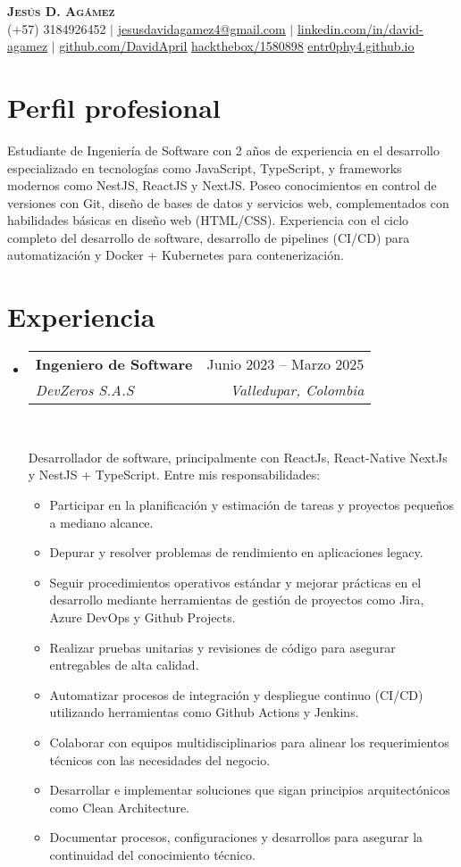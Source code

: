 \documentclass[letterpaper,11pt]{article}
\makeatletter
\newcommand{\resumeItem}[1]{
  \item\small{
    {#1 \vspace{-2pt}}
  }
}
\newcommand{\resumeSubheading}[4]{
  \vspace{-2pt}\item
    \begin{tabular*}{0.97\textwidth}[t]{l@{\extracolsep{\fill}}r}
      \textbf{#1} & #2 \\
      \textit{\small#3} & \textit{\small #4} \\
    \end{tabular*}\vspace{-7pt}
}
\newcommand{\resumeSubHeadingListStart}{\begin{itemize}[leftmargin=0.15in, label={}]}
\newcommand{\resumeSubHeadingListEnd}{\end{itemize}}
\newcommand{\resumeItemListStart}{\begin{itemize}}
\newcommand{\resumeItemListEnd}{\end{itemize}\vspace{-5pt}}
\makeatother
\begin{document}
\begin{center}
    \textbf{\Huge \scshape Jesús D. Agámez} \\ \vspace{1pt}
    \small (+57) 3184926452 $|$ \href{mailto:jesusdavidagamez4@gmail.com}{\underline{jesusdavidagamez4@gmail.com}} $|$
    \href{https://linkedin.com/in/david-agamez}{\underline{linkedin.com/in/david-agamez}} $|$
    \href{https://github.com/DavidApril}{\underline{github.com/DavidApril}}
    \href{https://app.hackthebox.com/profile/1580898}{\underline{hackthebox/1580898}}
    \href{https://entr0phy4.github.io}{\underline{entr0phy4.github.io}}
\end{center}

\section{Perfil profesional}
    \par
    {Estudiante de Ingeniería de Software con 2 años de experiencia en el desarrollo especializado en tecnologías como JavaScript, TypeScript, y frameworks modernos como NestJS, ReactJS y NextJS. Poseo conocimientos en control de versiones con Git, diseño de bases de datos y servicios web, complementados con habilidades básicas en diseño web (HTML/CSS). Experiencia con el ciclo completo del desarrollo de software, desarrollo de pipelines (CI/CD) para automatización y Docker + Kubernetes para contenerización.}


\section{Experiencia}
  \resumeSubHeadingListStart
    \resumeSubheading
      {Ingeniero de Software}{Junio 2023 -- Marzo 2025}
      {DevZeros S.A.S}{Valledupar, Colombia}
      \
      \par{Desarrollador de software, principalmente con ReactJs, React-Native NextJs y NestJS  + TypeScript. Entre mis
      responsabilidades:}

      \resumeItemListStart
        \resumeItem{Participar en la planificación y estimación de tareas y proyectos pequeños a mediano alcance.}
        \resumeItem{Depurar y resolver problemas de rendimiento en aplicaciones legacy.}
        \resumeItem{Seguir procedimientos operativos estándar y mejorar prácticas en el desarrollo mediante herramientas de gestión de proyectos como Jira, Azure DevOps y Github Projects.}
        \resumeItem{Realizar pruebas unitarias y revisiones de código para asegurar entregables de alta calidad.}
        \resumeItem{Automatizar procesos de integración y despliegue continuo (CI/CD) utilizando herramientas como Github Actions y Jenkins.}
        \resumeItem{Colaborar con equipos multidisciplinarios para alinear los requerimientos técnicos con las necesidades del negocio.}
        \resumeItem{Desarrollar e implementar soluciones que sigan principios arquitectónicos como Clean Architecture.}
        \resumeItem{Documentar procesos, configuraciones y desarrollos para asegurar la continuidad del conocimiento técnico.}
      \resumeItemListEnd
    \resumeSubHeadingListEnd
\end{document}

